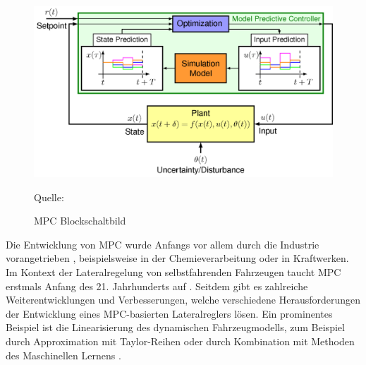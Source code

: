 \begin{figure}[H]
    \centering
    \includegraphics[width=0.75\linewidth]{Pictures/MPC_general.png}
    \caption{MPC Blockschaltbild}
    Quelle: \cite{mpc-uni-stuttgart}
    \label{fig:MPC}
\end{figure}

Die Entwicklung von \gls{MPC} wurde Anfangs vor allem durch die Industrie vorangetrieben \cite{qin1997overview}, beispielsweise in der Chemieverarbeitung oder in Kraftwerken. 
Im Kontext der Lateralregelung von selbstfahrenden Fahrzeugen taucht \gls{MPC} erstmals Anfang des 21. Jahrhunderts auf \cite{mpc-of-an-autonomous-vehicle}. 
Seitdem gibt es zahlreiche Weiterentwicklungen und Verbesserungen, welche verschiedene Herausforderungen der Entwicklung eines \gls{MPC}-basierten Lateralreglers lösen.
Ein prominentes Beispiel ist die Linearisierung des dynamischen Fahrzeugmodells, zum Beispiel durch Approximation mit Taylor-Reihen \cite{gao2021robust} oder durch Kombination mit Methoden des Maschinellen Lernens \cite{ilmpc}.
